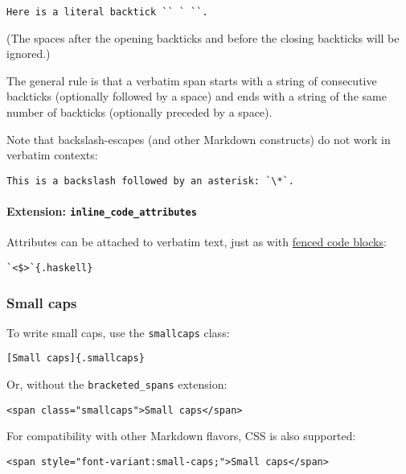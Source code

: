 \documentclass[]{article}
\begin{document}
\begin{verbatim}
Here is a literal backtick `` ` ``.
\end{verbatim}

(The spaces after the opening backticks and before the closing backticks
will be ignored.)

The general rule is that a verbatim span starts with a string of
consecutive backticks (optionally followed by a space) and ends with a
string of the same number of backticks (optionally preceded by a space).

Note that backslash-escapes (and other Markdown constructs) do not work
in verbatim contexts:

\begin{verbatim}
This is a backslash followed by an asterisk: `\*`.
\end{verbatim}

\hypertarget{extension-inline_code_attributes}{%
\paragraph{\texorpdfstring{Extension:
\texttt{inline\_code\_attributes}}{Extension: inline\_code\_attributes}}\label{extension-inline_code_attributes}}

Attributes can be attached to verbatim text, just as with
\protect\hyperlink{fenced-code-blocks}{fenced code blocks}:

\begin{verbatim}
`<$>`{.haskell}
\end{verbatim}

\hypertarget{small-caps}{%
\subsubsection{Small caps}\label{small-caps}}

To write small caps, use the \texttt{smallcaps} class:

\begin{verbatim}
[Small caps]{.smallcaps}
\end{verbatim}

Or, without the \texttt{bracketed\_spans} extension:

\begin{verbatim}
<span class="smallcaps">Small caps</span>
\end{verbatim}

For compatibility with other Markdown flavors, CSS is also supported:

\begin{verbatim}
<span style="font-variant:small-caps;">Small caps</span>
\end{verbatim}
\end{document}
